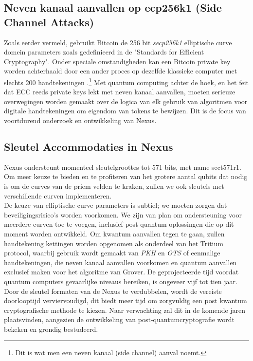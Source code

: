 \documentclass[11pt]{article}
\begin{document}
\subsection{Neven kanaal aanvallen op ecp256k1 (Side Channel Attacks)}

Zoals eerder vermeld, gebruikt Bitcoin de 256 bit \textit{secp256k1} elliptische curve domein parameters zoals gedefinieerd in de "Standards for Efficient Cryptography".
Onder speciale omstandigheden kan een Bitcoin private key worden achterhaald door een ander proces op dezelfde klassieke computer met slechts 200 handtekeningen \cite{sigleak}.\footnote{Dit is wat men een neven kanaal (side channel) aanval noemt.}
Met quantum computing achter de hoek, en het feit dat ECC reeds private keys lekt met neven kanaal aanvallen, moeten serieuze overwegingen worden gemaakt over de logica van elk gebruik van algoritmen voor digitale handtekeningen om eigendom van tokens te bewijzen. 
Dit is de focus van voortdurend onderzoek en ontwikkeling van Nexus.


\subsection{Sleutel Accommodaties in Nexus} 

Nexus ondersteunt momenteel sleutelgroottes tot 571 bits, met name sect571r1. Om meer keuze te bieden en te profiteren van het grotere aantal qubits dat nodig is om de curves van de priem velden te kraken, zullen we ook sleutels met verschillende curven implementeren.\\

\noindent De keuze van elliptische curve parameters is subtiel; we moeten zorgen dat beveiligingsrisico's worden voorkomen. We zijn van plan om ondersteuning voor meerdere curven toe te voegen, inclusief post-quantum oplossingen die op dit moment worden ontwikkeld. Om kwantum aanvallen tegen te gaan, zullen handtekening kettingen worden opgenomen als onderdeel van het Tritium protocol, waarbij gebruik wordt gemaakt van \textit{PKH} en \textit{OTS} of eenmalige handtekeningen, die neven kanaal aanvallen voorkomen en quantum aanvallen exclusief maken voor het algoritme van Grover. De geprojecteerde tijd voordat quantum computers gevaarlijke niveaus bereiken, is ongeveer vijf tot tien jaar. Door de sleutel formaten van de Nexus te verdubbelen, wordt de vereiste doorlooptijd verviervoudigd, dit biedt meer tijd om zorgvuldig een post kwantum cryptografische methode te kiezen. Naar verwachting zal dit in de komende jaren plaatsvinden, aangezien de ontwikkeling van post-quantumcryptografie wordt bekeken en grondig bestudeerd.
\end{document}
